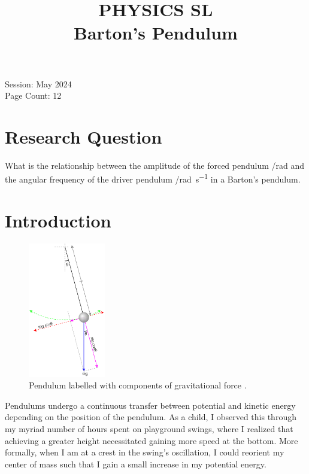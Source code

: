 \documentclass[letterpaper, 12pt]{article}
\title{PHYSICS SL
\\
Barton's Pendulum}
\author{}
\date{}
\begin{document}
\nocite{*}

\maketitle
\begin{center}
    Session: May 2024
    \\
    Page Count: 12
\end{center}
\newpage

\tableofcontents
\newpage

\setcounter{page}{1}

\section{Research Question}

What is the relationship between the amplitude of
the forced pendulum /\unit{rad} and the
angular frequency of the driver pendulum /\unit{rad.s^{-1}} in a Barton's pendulum.

\section{Introduction}

\begin{figure}
    \centering
    \includegraphics[width=0.3\textwidth]{labelledPendulum.png}
    \caption{Pendulum labelled with components of gravitational force \protect\cite{krishnavedalaEnglishDiagramDepicting2013}.}
    \label{fig:labelledPendulum}
\end{figure}

Pendulums undergo a continuous transfer
between potential and kinetic energy depending
on the position of the pendulum. As a child, I
observed this through my myriad number of hours
spent on playground swings, where I realized
that achieving a greater height necessitated
gaining more speed at the bottom. More formally,
when I am at a crest in the swing's oscillation,
I could reorient my center of mass such that
I gain a small increase in my
potential energy.
\end{document}
